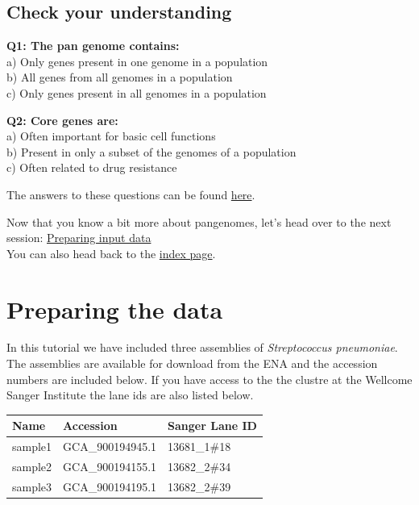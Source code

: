 \documentclass[11pt]{article}
\begin{document}
\hypertarget{check-your-understanding}{%
\subsection{Check your understanding}\label{check-your-understanding}}

\textbf{Q1: The pan genome contains:}\\
a) Only genes present in one genome in a population\\
b) All genes from all genomes in a population\\
c) Only genes present in all genomes in a population


\newpage


\textbf{Q2: Core genes are:}\\
a) Often important for basic cell functions\\
b) Present in only a subset of the genomes of a population\\
c) Often related to drug resistance

The answers to these questions can be found \href{answers.ipynb}{here}.

Now that you know a bit more about pangenomes, let's head over to the
next session: \href{prepare_data.ipynb}{Preparing input data}\\
You can also head back to the \href{index.ipynb}{index page}.





\newpage






    \hypertarget{preparing-the-data}{%
\section{Preparing the data}\label{preparing-the-data}}

In this tutorial we have included three assemblies of
\textit{Streptococcus pneumoniae}. The assemblies are available for
download from the ENA and the accession numbers are included below. If
you have access to the the clustre at the Wellcome Sanger Institute the
lane ids are also listed below.

\begin{longtable}[]{@{}lll@{}}
\hline
Name & Accession & Sanger Lane ID\tabularnewline
\hline
\endhead
sample1 & GCA\_900194945.1 & 13681\_1\#18\tabularnewline
sample2 & GCA\_900194155.1 & 13682\_2\#34\tabularnewline
sample3 & GCA\_900194195.1 & 13682\_2\#39\tabularnewline
\hline
\end{longtable}
\end{document}
